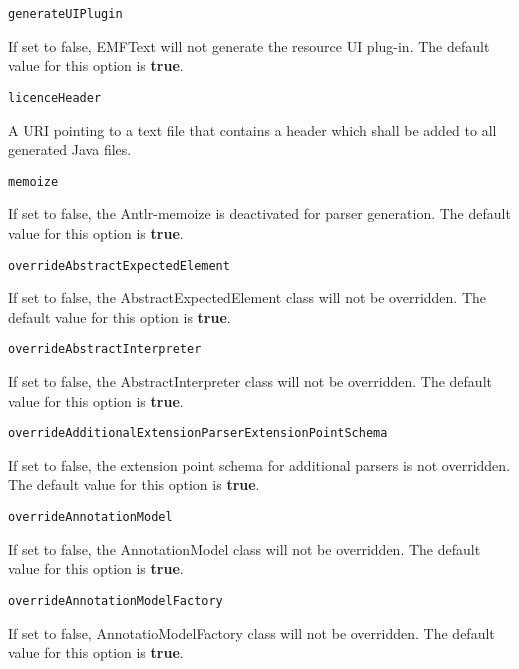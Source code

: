 \noindent\texttt{generateUIPlugin}
\begin{myindentpar}{1cm}
If set to false, EMFText will not generate the resource UI plug-in. The default value for this option is \textbf{true}.
\end{myindentpar}

\noindent\texttt{licenceHeader}
\begin{myindentpar}{1cm}
A URI pointing to a text file that contains a header which shall be added to all generated Java files.
\end{myindentpar}

\noindent\texttt{memoize}
\begin{myindentpar}{1cm}
If set to false, the Antlr-memoize is deactivated for parser generation. The default value for this option is \textbf{true}.
\end{myindentpar}

\noindent\texttt{overrideAbstractExpectedElement}
\begin{myindentpar}{1cm}
If set to false, the AbstractExpectedElement class will not be overridden. The default value for this option is \textbf{true}.
\end{myindentpar}

\noindent\texttt{overrideAbstractInterpreter}
\begin{myindentpar}{1cm}
If set to false, the AbstractInterpreter class will not be overridden. The default value for this option is \textbf{true}.
\end{myindentpar}

\noindent\texttt{overrideAdditionalExtensionParserExtensionPointSchema}
\begin{myindentpar}{1cm}
If set to false, the extension point schema for additional parsers is not overridden. The default value for this option is \textbf{true}.
\end{myindentpar}

\noindent\texttt{overrideAnnotationModel}
\begin{myindentpar}{1cm}
If set to false, the AnnotationModel class will not be overridden. The default value for this option is \textbf{true}.
\end{myindentpar}

\noindent\texttt{overrideAnnotationModelFactory}
\begin{myindentpar}{1cm}
If set to false, AnnotatioModelFactory class will not be overridden. The default value for this option is \textbf{true}.
\end{myindentpar}

